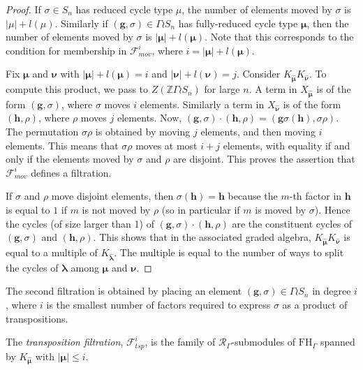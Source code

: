 \documentclass[ALCO,Unicode]{cedram}
\newcommand{\bs}{\boldsymbol}
\newcommand{\RGamma}{\mathcal{R}_{\Gamma}}
\newcommand{\FHG}{\mathrm{FH}_{\Gamma}}
\newcommand{\RGamma}{\mathcal{R}_{\Gamma}}
\newcommand{\FHG}{\mathrm{FH}_{\Gamma}}
\begin{document}
\begin{proof}
If $\sigma \in S_n$ has reduced cycle type $\mu$, the number of elements moved by $\sigma$ is $|\mu| + l(\mu)$. Similarly if $(\mathbf{g}, \sigma) \in \Gamma \wr S_n$ has fully-reduced cycle type $\bs\mu$, then the number of elements moved by $\sigma$ is $|\bs \mu| + l(\bs \mu)$. Note that this corresponds to the condition for membership in $\mathcal{F}_{mov}^i$, where $i = |\bs \mu| + l(\bs \mu)$. 

Fix $\bs \mu$ and $\bs \nu$ with $|\bs \mu| + l(\bs \mu) = i$ and $|\bs \nu| + l(\bs \nu) = j$. Consider $K_{\bm\hat{\bs \mu}}K_{\bm\hat{\bs \nu}}$. To compute this product, we pass to $Z(\mathbb{Z}\Gamma \wr S_n)$ for large $n$. A term in $X_{\bm\hat{\bs \mu}}$ is of the form $(\mathbf{g}, \sigma)$, where $\sigma$ moves $i$ elements. Similarly a term in $X_{\bm\hat{\bs \nu}}$ is of the form $(\mathbf{h}, \rho)$, where $\rho$ moves $j$ elements. Now, $(\mathbf{g}, \sigma) \cdot (\mathbf{h}, \rho) = (\mathbf{g}\sigma(\mathbf{h}), \sigma\rho)$. The permutation $\sigma \rho$ is obtained by moving $j$ elements, and then moving $i$ elements. This means that $\sigma \rho$ moves at most $i+j$ elements, with equality if and only if the elements moved by $\sigma$ and $\rho$ are disjoint. This proves the assertion that $\mathcal{F}_{mov}^i$ defines a filtration.

If $\sigma$ and $\rho$ move disjoint elements, then $\sigma(\mathbf{h}) = \mathbf{h}$ because the $m$-th factor in $\mathbf{h}$ is equal to $1$ if $m$ is not moved by $\rho$ (so in particular if $m$ is moved by $\sigma$). Hence the cycles (of size larger than 1) of $(\mathbf{g}, \sigma) \cdot (\mathbf{h}, \rho)$ are the constituent cycles of $(\mathbf{g}, \sigma)$ and $(\mathbf{h}, \rho)$. This shows that in the associated graded algebra, $K_{\bm\hat{\bs \mu}}K_{\bm\hat{\bs \nu}}$ is equal to a multiple of $K_{\bm\hat{\bs \lambda}}$. The multiple is equal to the number of ways to split the cycles of $\bs \lambda$ among $\bs \mu$ and $\bs \nu$.
\end{proof}


The second filtration is obtained by placing an element $(\mathbf{g}, \sigma) \in \Gamma \wr S_n$ in degree $i$, where $i$ is the smallest number of factors required to express $\sigma$ as a product of transpositions. 
\begin{definition}
The \emph{transposition filtration}, $\mathcal{F}_{tsp}^i$, is the family of $\RGamma$-submodules of $\FHG$ spanned by $K_{\bm\hat{\bs \mu}}$ with $|\bs \mu| \leq i$.
\end{definition}
\end{document}
